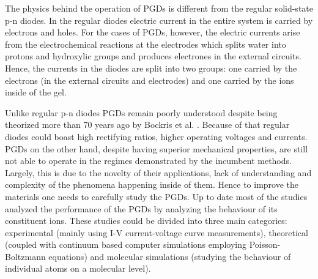 \documentclass[twoside,twocolumn,9pt]{article}
\begin{document}
The physics behind the operation of PGDs is different from the regular solid-state p-n diodes. In the regular diodes electric current in the entire system is carried by electrons and holes. For the cases of PGDs, however, the electric currents arise from the electrochemical reactions at the electrodes which splits water into protons and hydroxylic groups and produces electrones in the external circuits. Hence, the currents in the diodes are split into two groups: one carried by the electrons (in  the external circuits and electrodes) and one carried by the ions inside of the gel. 


Unlike regular p-n diodes PGDs remain poorly understood despite being theorized more than 70 years ago by Bockris et al. \cite{Bockris1954}. Because of that regular diodes could boast high rectifying ratios, higher operating voltages and currents. PGDs on the other hand, despite having superior mechanical properties, are still not able to operate in the regimes demonstrated by the incumbent methods. Largely, this is due to the novelty of their applications, lack of understanding and complexity of the phenomena happening inside of them. Hence to improve the materials one needs to carefully study the PGDs. 
Up to date most of the studies analyzed the performance of the PGDs by analyzing the behaviour of its constituent ions. These studies could be divided into three main categories: experimental (mainly using I-V current-voltage curve measurements), theoretical (coupled with continuum based computer simulations employing Poisson-Boltzmann equations) and molecular simulations (studying the behaviour of individual atoms on a molecular level).


\end{document}
